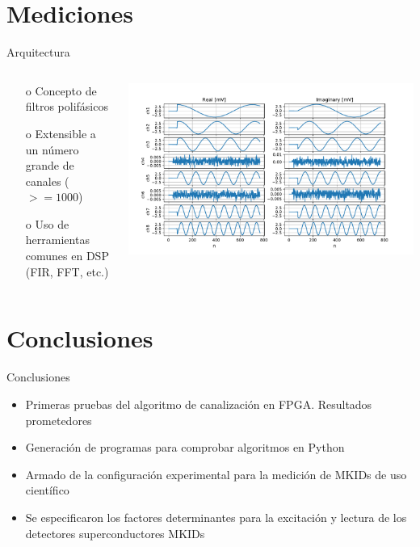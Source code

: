 \documentclass[ignorenonframetext,12pt]{beamer}
\begin{document}
\section{Mediciones}
				\begin{frame}{Arquitectura}
								\begin{columns}
												\begin{column}{0.4\textwidth}
																\begin{itemize}
																				\item[o] Concepto de filtros polifásicos
																				\item[o] Extensible a un n\'umero grande de canales ($>=1000$)
																				\item[o] Uso de herramientas comunes en DSP (FIR, FFT, etc.)
																\end{itemize}
												\end{column}
												\begin{column}{0.6\textwidth}
																\includegraphics[width=\textwidth]{gd_chann16_out_1_8}
												\end{column}
								\end{columns}
				\end{frame}

\section{Conclusiones}
\begin{frame}{Conclusiones}
				\begin{itemize}
								\item Primeras pruebas del algoritmo de canalización en FPGA.
												Resultados prometedores
								\item Generación de programas para comprobar algoritmos en Python
								\item Armado de la configuración experimental para la medición
												de MKIDs de uso científico
								\item Se especificaron los factores determinantes para la
												excitación y lectura de los detectores superconductores MKIDs
				\end{itemize}
\end{frame}
\end{document}
